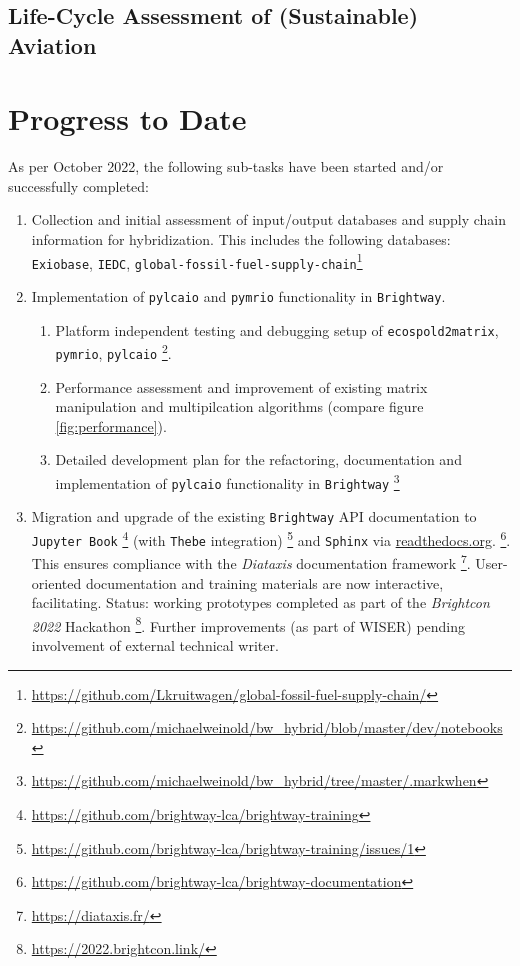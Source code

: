 \documentclass{article}
\begin{document}
    \subsection{Life-Cycle Assessment of (Sustainable) Aviation}

\newpage
\section{Progress to Date}

    As per October 2022, the following sub-tasks have been started and/or successfully completed:
    
    \begin{enumerate}
        \item Collection and initial assessment of input/output databases and supply chain information for hybridization. This includes the following databases: \texttt{Exiobase}, \texttt{IEDC}, \texttt{global-fossil-fuel-supply-chain}\footnote{\url{https://github.com/Lkruitwagen/global-fossil-fuel-supply-chain/}}
        \item
            Implementation of \texttt{pylcaio} and \texttt{pymrio} functionality in \texttt{Brightway}.
            \begin{enumerate}
                \item
                    Platform independent testing and debugging setup of \texttt{ecospold2matrix}, \texttt{pymrio}, \texttt{pylcaio} \footnote{\url{https://github.com/michaelweinold/bw_hybrid/blob/master/dev/notebooks}}.
                \item
                    Performance assessment and improvement of existing matrix manipulation and multipilcation algorithms (compare figure \ref{fig:performance}).
                \item
                    Detailed development plan for the refactoring, documentation and implementation of \texttt{pylcaio} functionality in \texttt{Brightway} \footnote{\url{https://github.com/michaelweinold/bw_hybrid/tree/master/.markwhen}}
            \end{enumerate}
        \item
            Migration and upgrade of the existing \texttt{Brightway} API documentation to \texttt{Jupyter Book} \footnote{\url{https://github.com/brightway-lca/brightway-training}} (with \texttt{Thebe} integration) \footnote{\url{https://github.com/brightway-lca/brightway-training/issues/1}} and \texttt{Sphinx} via \url{readthedocs.org}.  \footnote{\url{https://github.com/brightway-lca/brightway-documentation}}. This ensures compliance with the  \textit{Diataxis} documentation framework \footnote{\url{https://diataxis.fr/}}. User-oriented documentation and training materials are now interactive, facilitating. Status: working prototypes completed as part of the \textit{Brightcon 2022} Hackathon \footnote{\url{https://2022.brightcon.link/}}. Further improvements (as part of WISER) pending involvement of external technical writer.

\end{enumerate}
\end{document}
